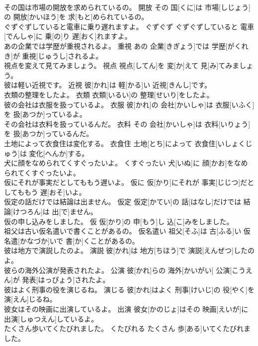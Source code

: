 \documentclass[8pt]{extreport}
\begin{document}
\begin{CJK}{UTF8}{min}
\\	その国は市場の開放を求められているの。	開放	その 国[くに]は 市場[しじょう]の 開放[かいほう]を 求[もと]められているの。	
\\	ぐずぐずしていると電車に乗り遅れますよ。	ぐずぐず	ぐずぐずしていると 電車[でんしゃ]に 乗[の]り 遅[おく]れますよ。	
\\	あの企業では学歴が重視されるよ。	重視	あの 企業[きぎょう]では 学歴[がくれき]が 重視[じゅうし]されるよ。	
\\	視点を変えて見てみましょう。	視点	視点[してん]を 変[か]えて 見[み]てみましょう。	
\\	彼は軽い近視です。	近視	彼[かれ]は 軽[かる]い 近視[きんし]です。	
\\	衣類の整理をしたよ。	衣類	衣類[いるい]の 整理[せいり]をしたよ。	
\\	彼の会社は衣服を扱っているよ。	衣服	彼[かれ]の 会社[かいしゃ]は 衣服[いふく]を 扱[あつか]っているよ。	
\\	その会社は衣料を扱っているんだ。	衣料	その 会社[かいしゃ]は 衣料[いりょう]を 扱[あつか]っているんだ。	
\\	土地によって衣食住は変化する。	衣食住	土地[とち]によって 衣食住[いしょくじゅう]は 変化[へんか]する。	
\\	犬に顔をなめられてくすぐったいよ。	くすぐったい	犬[いぬ]に 顔[かお]をなめられてくすぐったいよ。	
\\	仮にそれが事実だとしてももう遅いよ。	仮に	仮[かり]にそれが 事実[じじつ]だとしてももう 遅[おそ]いよ。	
\\	仮定の話だけでは結論は出ません。	仮定	仮定[かてい]の 話[はなし]だけでは 結論[けつろん]は 出[で]ません。	
\\	仮の申し込みをしました。	仮	仮[かり]の 申[もう]し 込[こ]みをしました。	
\\	祖父は古い仮名遣いで書くことがあるの。	仮名遣い	祖父[そふ]は 古[ふる]い 仮名遣[かなづか]いで 書[か]くことがあるの。	
\\	彼は地方で演説したのよ。	演説	彼[かれ]は 地方[ちほう]で 演説[えんぜつ]したのよ。	
\\	彼らの海外公演が発表されたよ。	公演	彼[かれ]らの 海外[かいがい] 公演[こうえん]が 発表[はっぴょう]されたよ。	
\\	彼はよく刑事の役を演じるね。	演じる	彼[かれ]はよく 刑事[けいじ]の 役[やく]を 演[えん]じるね。	
\\	彼女はその映画に出演しているよ。	出演	彼女[かのじょ]はその 映画[えいが]に 出演[しゅつえん]しているよ。	
\\	たくさん歩いてくたびれました。	くたびれる	たくさん 歩[ある]いてくたびれました。	

\end{CJK}
\end{document}
